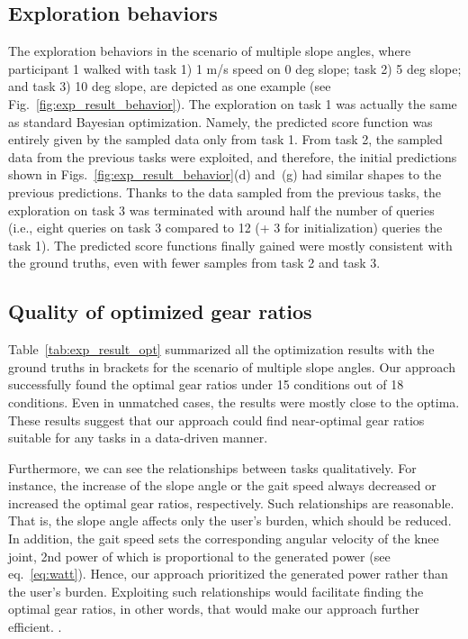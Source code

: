 \documentclass[twocolumn]{svjour3}          %
\begin{document}
\subsection{Exploration behaviors}

The exploration behaviors in the scenario of multiple slope angles, where participant 1 walked with task 1) 1 m/s speed on 0 deg slope; task 2) 5 deg slope; and task 3) 10 deg slope, are depicted as one example (see Fig.~\ref{fig:exp_result_behavior}).
The exploration on task 1 was actually the same as standard Bayesian optimization. Namely, the predicted score function was entirely given by the sampled data only from task 1.
From task 2, the sampled data from the previous tasks were exploited, and therefore, the initial predictions shown in Figs.~\ref{fig:exp_result_behavior}(d) and~(g) had similar shapes to the previous predictions.
Thanks to the data sampled from the previous tasks, the exploration on task 3 was terminated with around half the number of queries (i.e., eight queries on task 3 compared to 12 (+ 3 for initialization) queries the task 1).
The predicted score functions finally gained were mostly consistent with the ground truths, even with fewer samples from task 2 and task 3.

\subsection{Quality of optimized gear ratios}

Table~\ref{tab:exp_result_opt} summarized all the optimization results with the ground truths in brackets for the scenario of multiple slope angles.
Our approach successfully found the optimal gear ratios under 15 conditions out of 18 conditions.
Even in unmatched cases, the results were mostly close to the optima.
These results suggest that our approach could find near-optimal gear ratios suitable for any tasks in a data-driven manner.

Furthermore, we can see the relationships between tasks qualitatively.
For instance, the increase of the slope angle or the gait speed always decreased or increased the optimal gear ratios, respectively.
Such relationships are reasonable.
That is, the slope angle affects only the user's burden, which should be reduced.
In addition, the gait speed sets the corresponding angular velocity of the knee joint, 2nd power of which is proportional to the generated power (see eq.~\eqref{eq:watt}). Hence, our approach prioritized the generated power rather than the user's burden.
Exploiting such relationships would facilitate finding the optimal gear ratios, in other words, that would make our approach further efficient. .
\end{document}
